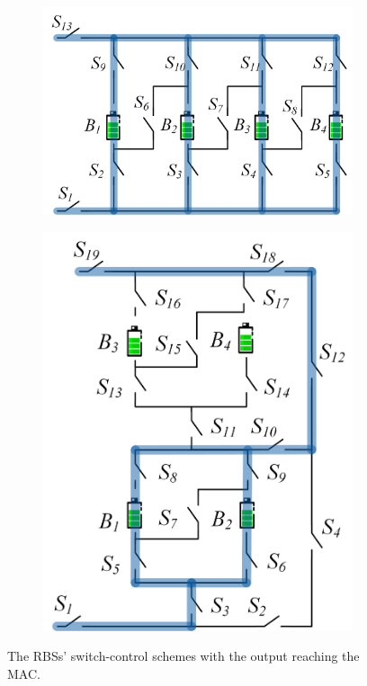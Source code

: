 \documentclass{article}
\begin{document}
\begin{figure}[htbp]
\begin{subfigure}[b]{0.2\textwidth}
        \caption{}
        \label{fig:e4-mac}
    \end{subfigure}
    \hspace{0.02\textwidth}
    \begin{subfigure}[b]{0.4\textwidth}
        \includegraphics[width=\textwidth]{f4-mac.png}
        \caption{}
        \label{fig:f4-mac}
    \end{subfigure}
    \hspace{0.02\textwidth}
    \begin{subfigure}[b]{0.31\textwidth}
        \includegraphics[width=\textwidth]{e2f2-mac.png}
        \caption{}
        \label{fig:e2f2-mac}
    \end{subfigure}
    \caption{The RBSs' switch-control schemes with the output reaching the MAC.}
\end{figure}
\end{document}
